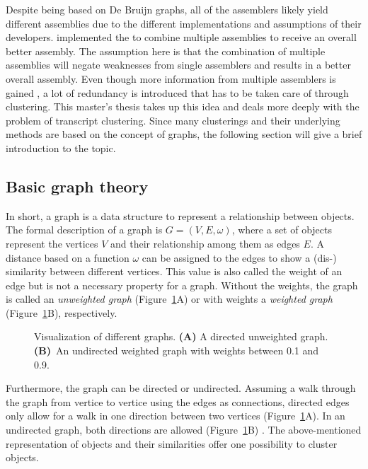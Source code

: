 \documentclass[12pt,a4paper,english]{article}
\begin{document}
	Despite being based on De Bruijn graphs, all of the assemblers likely yield different assemblies due to the different implementations and assumptions of their developers. \citeauthor{OysterRiverProtocol:18} implemented the \orp \citep{OysterRiverProtocol:18} to combine multiple assemblies to receive an overall better assembly. The assumption here is that the combination of multiple assemblies will negate weaknesses from single assemblers and results in a better overall assembly. Even though more information from multiple assemblers is gained \citep{hoelzer:19}, a lot of redundancy is introduced that has to be taken care of through clustering.
	This master's thesis takes up this idea and deals more deeply with the problem of transcript clustering.
	Since many clusterings and their underlying methods are based on the concept of graphs, the following section will give a brief introduction to the topic.
	
\subsection{Basic graph theory}    	
    In short, a graph is a data structure to represent a relationship between objects. The formal description of a graph is $ G = (V, E, \omega) $, where a set of objects represent the vertices $V$ and their relationship among them as edges $E$.
	A distance based on a function $\omega$ can be assigned to the edges to show a (dis-) similarity between different vertices. This value is also called the weight of an edge but is not a necessary property for a graph. Without the weights, the graph is called an \textit{unweighted graph} (Figure~\ref{img:graphs}A) or with weights a \textit{weighted graph} (Figure~\ref{img:graphs}B), respectively.
	
	\begin{figure}[h]
		\centering
		\def\svgwidth{\textwidth}
		
		\caption[Visualization of different graphs.]{Visualization of different graphs. \textbf{(A)} A directed unweighted graph. \textbf{(B)}~An undirected weighted graph with weights between 0.1 and 0.9.}
		\label{img:graphs}
	\end{figure}
	
	Furthermore, the graph can be directed or undirected. Assuming a walk through the graph from vertice to vertice using the edges as connections, directed edges only allow for a walk in one direction between two vertices (Figure~\ref{img:graphs}A). In an undirected graph, both directions are allowed (Figure~\ref{img:graphs}B) \citep{graph-theory:13}.
	The above-mentioned representation of objects and their similarities offer one possibility to cluster objects.
\end{document}
